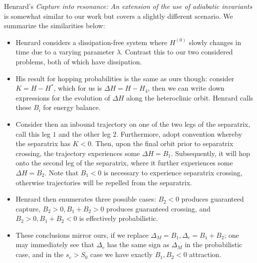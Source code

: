 \documentclass[11pt,
        usenames, %
        dvipsnames %
    ]{article}
\begin{document}
Henrard's \emph{Capture into resonance: An extension of the use of adiabatic
invariants} is somewhat similar to our work but covers a slightly different
scenario. We summarize the similarities below:
\begin{itemize}
    \item Henrard considers a dissipation-free system where $H^{(0)}$ slowly
        changes in time due to a varying parameter $\lambda$. Contrast this to
        our two considered problems, both of which have dissipation.

    \item His result for hopping probabilities is the same as ours though:
        consider $K = H - H^*$, which for us is $\Delta H = H - H_4$, then
        we can write down expressions for the evolution of $\Delta H$ along the
        heteroclinic orbit. Henrard calls these $B_i$ for energy balance.

    \item Consider then an inbound trajectory on one of the two legs of the
        separatrix, call this leg $1$ and the other leg $2$. Furthermore, adopt
        convention whereby the separatrix has $K < 0$. Then, upon the final
        orbit prior to separatrix crossing, the trajectory experiences some
        $\Delta H = B_1$. Subsequently, it will hop onto the second leg of the
        separatrix, where it further experiences some $\Delta H = B_2$. Note
        that $B_1 < 0$ is necessary to experience separatrix crossing, otherwise
        trajectories will be repelled from the separatrix.

    \item Henrard then enumerates three possible cases: $B_2 < 0$ produces
        guaranteed capture, $B_2 > 0, B_1 + B_2 > 0$ produces guaranteed
        crossing, and $B_2 > 0, B_1 + B_2 < 0$ is effectively probabilistic.

    \item These conclusions mirror ours, if we replace $\Delta_M = B_1, \Delta_c
        = B_1 + B_2$; one may immediately see that $\Delta_c$ has the same sign
        as $\Delta_M$ in the probabilistic case, and in the $s_c > S_{0}$ case
        we have exactly $B_1, B_2 < 0$ attraction.
\end{itemize}
\end{document}
